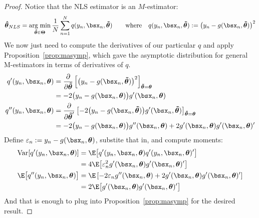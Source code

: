 \documentclass[12pt]{article}
\theoremstyle{plain}
\theoremstyle{definition}
\theoremstyle{remark}
\newcommand{\bstheta}{\boldsymbol{\theta}}
\newcommand{\bsTheta}{\boldsymbol{\Theta}}
\newcommand{\bshattheta}{\boldsymbol{\hat{\theta}}}
\newcommand{\bstildetheta}{\boldsymbol{\tilde{\theta}}}
\DeclareMathOperator*{\argmin}{arg\;min}
\newcommand{\Var}{\operatorname{Var}}
\newcommand{\dto}{\xrightarrow{d}}
\newcommand{\sumnN}{\sum^N_{n=1}}
\begin{document}
\begin{proof}
Notice that the NLS estimator is an $M$-estimator:
\begin{align*}
  \bshattheta_{NLS}
  = \argmin_{\bstildetheta\in\bsTheta}
  \frac{1}{N}\sumnN q(y_n,\bsx_n,\bstildetheta)
  \qquad\text{where}
  \quad
  q(y_n,\bsx_n,\bstildetheta):=
  \big(y_n-g(\bsx_n,\bstildetheta)\big)^2
\end{align*}
We now just need to compute the derivatives of our particular $q$ and
apply Proposition~\ref{prop:masymp}, which gave the asymptotic
distribution for general M-estimators in terms of derivatives of $q$.
\begin{align*}
  q'(y_n,\bsx_n,\bstheta)
  &= \frac{\partial}{\partial \bstildetheta}
  \left[
  \big(y_n-g(\bsx_n,\bstildetheta)\big)^2
  \right]_{\bstildetheta=\bstheta}
  \\
  &=
  -2
  \big(y_n-g(\bsx_n,\bstheta)\big)
  g'(\bsx_n,\bstheta)
  \\
  q''(y_n,\bsx_n,\bstheta)
  &= \frac{\partial}{\partial \bstildetheta'}
  \left[
  -2
  \big(y_n-g(\bsx_n,\bstildetheta)\big)
  g'(\bsx_n,\bstildetheta)
  \right]_{\bstildetheta=\bstheta}
  \\
  &=
  -2
  \big(y_n-g(\bsx_n,\bstheta)\big)
  g''(\bsx_n,\bstheta)
  +2 g'(\bsx_n,\bstheta)g'(\bsx_n,\bstheta)'
\end{align*}
Define $\varepsilon_n:=y_n-g(\bsx_n,\bstheta)$, substite that in, and
compute moments:
\begin{align}
  \Var[q'(y_n,\bsx_n,\bstheta)]
  &=
  \E\big[q'(y_n,\bsx_n,\bstheta)q'(y_n,\bsx_n,\bstheta)'\big]
  \notag\\
  &=
  4\E\big[\varepsilon_n^2g'(\bsx_n,\bstheta)g'(\bsx_n,\bstheta)'\big]
  \notag\\
  \E\big[q''(y_n,\bsx_n,\bstheta)\big]
  &=
  \E\left[
  -2
  \varepsilon_n
  g''(\bsx_n,\bstheta)
  +2 g'(\bsx_n,\bstheta)g'(\bsx_n,\bstheta)'
  \right]
  \notag\\
  &=
  2 \E\big[
  g'(\bsx_n,\bstheta)g'(\bsx_n,\bstheta)'
  \big]
  \label{nlsproof}
\end{align}
And that is enough to plug into Proposition~\ref{prop:masymp} for the
desired result.


\end{proof}
\end{document}
